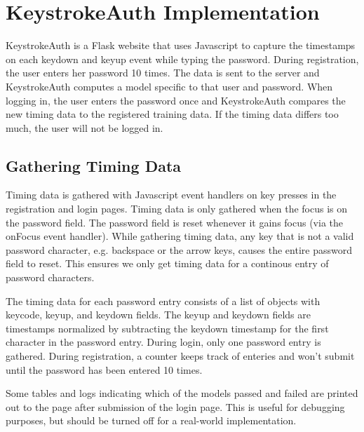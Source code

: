 \documentclass{article}
\begin{document}
\section{KeystrokeAuth Implementation}
KeystrokeAuth is a Flask website that uses Javascript to capture the timestamps on each keydown and keyup event while typing the password.
During registration, the user enters her password 10 times.
The data is sent to the server and KeystrokeAuth computes a model specific to that user and password.
When logging in, the user enters the password once and KeystrokeAuth compares the new timing data to the registered training data.
If the timing data differs too much, the user will not be logged in.

\subsection{Gathering Timing Data}
Timing data is gathered with Javascript event handlers on key presses in the registration and login pages.
Timing data is only gathered when the focus is on the password field. The password field is reset whenever it gains focus (via the onFocus event handler).  
While gathering timing data, any key that is not a valid password character, e.g. backspace or the arrow keys, causes the entire password field to reset.
This ensures we only get timing data for a continous entry of password characters.

The timing data for each password entry consists of a list of objects with keycode, keyup, and keydown fields. The keyup and keydown fields are timestamps normalized by subtracting the keydown timestamp for the first character in the password entry. 
During login, only one password entry is gathered. During registration, a counter keeps track of enteries and won't submit until the password has been entered 10 times.

Some tables and logs indicating which of the models passed and failed are printed out to the page after submission of the login page. 
This is useful for debugging purposes, but should be turned off for a real-world implementation.
\end{document}

